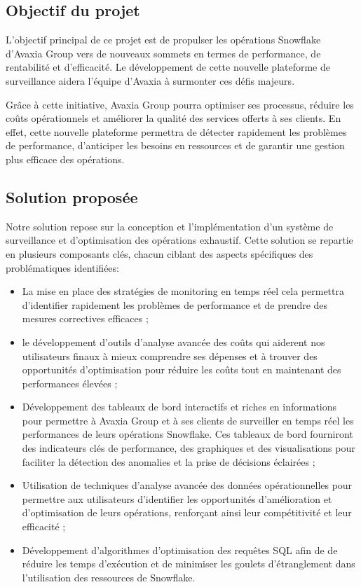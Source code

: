 \subsection{Objectif du projet}
\par  L'objectif principal de ce projet est de propulser les opérations Snowflake d'Avaxia Group vers de nouveaux sommets en termes de performance, de rentabilité et d'efficacité. 
Le développement de cette nouvelle plateforme de surveillance aidera l'équipe d'Avaxia à surmonter ces défis majeurs.
\par Grâce à cette initiative, Avaxia Group pourra optimiser ses processus, réduire les coûts opérationnels et améliorer la qualité des services offerts à ses clients. En effet, cette nouvelle plateforme 
permettra de détecter rapidement les problèmes de performance, d'anticiper les besoins en ressources et de garantir une gestion plus efficace des opérations.
\subsection{Solution proposée}
\par Notre solution repose sur la conception et l'implémentation d'un système de surveillance et d'optimisation des opérations exhaustif. 
Cette solution se repartie en plusieurs composants clés, chacun ciblant des aspects spécifiques des problématiques identifiées:

\begin{itemize}
    \item La mise en place des stratégies de monitoring en temps réel cela permettra d'identifier rapidement les problèmes de performance et de prendre des mesures correctives efficaces ;
    \item le développement d'outils d'analyse avancée des coûts qui aiderent nos utilisateurs finaux à mieux comprendre ses dépenses et à trouver des opportunités d'optimisation pour 
    réduire les coûts tout en maintenant des performances élevées ;
    \item Développement des tableaux de bord interactifs et riches en informations pour permettre à Avaxia Group et à ses clients de surveiller en temps réel les performances de leurs opérations Snowflake. 
    Ces tableaux de bord fourniront des indicateurs clés de performance, des graphiques et des visualisations pour faciliter la détection des anomalies et la prise de décisions éclairées ;
    \item Utilisation de techniques d'analyse avancée des données opérationnelles pour permettre aux utilisateurs  d'identifier les opportunités d'amélioration et d'optimisation de leurs opérations, 
    renforçant ainsi leur compétitivité et leur efficacité ;
    \item Développement d'algorithmes d'optimisation des requêtes SQL afin de de réduire les temps d'exécution et de minimiser les goulets d'étranglement dans l'utilisation des ressources de Snowflake.
\end{itemize}


